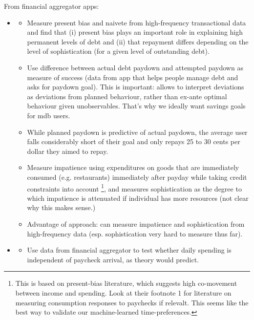 \documentclass[a4paper, 11pt]{report}
\begin{document}
From financial aggregator apps:
\begin{itemize}
	\item \citet{kuchler2020sticking}
	\begin{itemize}
    \item Measure present bias and naivete from high-frequency transactional data and find that (i) present bias plays an important role in explaining high permanent levels of debt and (ii) that repayment differs depending on the level of sophistication (for a given level of outstanding debt).

    \item Use difference between actual debt paydown and attempted paydown as measure of success (data from app that helps people manage debt and asks for paydown goal). This is important: allows to interpret deviations as deviations from planned behaviour, rather than ex-ante optimal behaviour given unobservables. That's why we ideally want savings goals for mdb users.

    \item While planned paydown is predictive of actual paydown, the average user falls considerably short of their goal and only repays 25 to 30 cents per dollar they aimed to repay.

    \item Measure impatience using expenditures on goods that are immediately consumed (e.g. restaurants) immediately after payday while taking credit constraints into account \footnote{This is based on present-bias literature, which suggests high co-movement between income and spending. Look at their footnote 1 for literature on measuring consumption responses to paychecks if relevalt. This seems like the best way to validate our machine-learned time-preferences.}, and measures sophistication as the degree to which impatience is attenuated if individual has more resources (not clear why this makes sense.)

    \item Advantage of approach: can measure impatience and sophistication from high-frequency data (esp. sophistication very hard to measure thus far).
	\end{itemize}

	\item \citet{gelman2014harnessing}
	\begin{itemize}
		\item Use data from financial aggregator to test whether daily spending is independent of paycheck arrival, as theory would predict.


\end{itemize}
\end{itemize}
\end{document}
